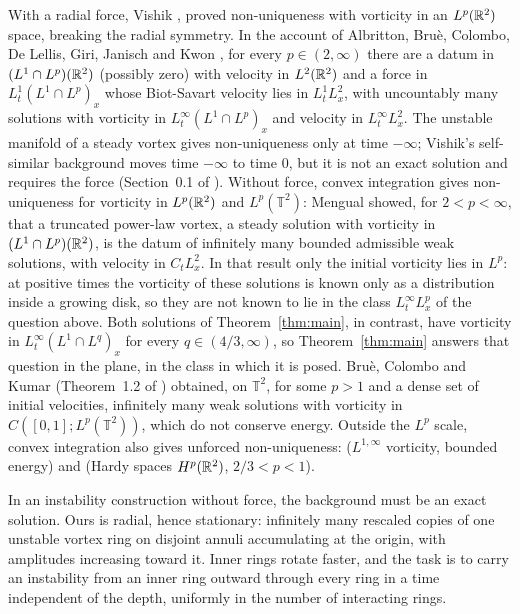 With a radial force, Vishik \cite{Vishik1}, \cite{Vishik2} proved
non-uniqueness with vorticity in an $L^p(\mathbb{R}^2)$ space, breaking the radial symmetry. In the
account of Albritton, Bru\`e, Colombo, De Lellis, Giri, Janisch and Kwon
\cite{ABCDGJK}, for every $p\in(2,\infty)$ there are a datum in $(L^1\cap L^p)(\mathbb{R}^2)$
(possibly zero) with velocity in $L^2(\mathbb{R}^2)$ and a force in $L^1_t(L^1\cap L^p)_x$ whose
Biot-Savart velocity lies in $L^1_tL^2_x$, with uncountably many solutions with vorticity in
$L^\infty_t(L^1\cap L^p)_x$ and velocity in $L^\infty_tL^2_x$. The unstable
manifold of a steady vortex gives non-uniqueness only at time $-\infty$;
Vishik's self-similar background moves time $-\infty$ to time $0$, but it is
not an exact solution and requires the force (Section~0.1 of \cite{ABCDGJK}).
Without force, convex integration gives non-uniqueness for vorticity in $L^p(\mathbb{R}^2)$ and
$L^p(\mathbb T^2)$:
Mengual \cite{Mengual} showed, for $2<p<\infty$, that a truncated power-law
vortex, a steady solution with vorticity in $(L^1\cap L^p)(\mathbb{R}^2)$, is the datum of
infinitely many bounded admissible weak solutions, with velocity in $C_tL^2_x$.
In that result only the initial vorticity lies in $L^p$: at positive times the
vorticity of these solutions is known only as a distribution inside a growing disk,
so they are not known to lie in the class $L^\infty_tL^p_x$ of the question above.
Both solutions of Theorem~\ref{thm:main}, in contrast, have vorticity in
$L^\infty_t(L^1\cap L^q)_x$ for every $q\in(4/3,\infty)$, so Theorem~\ref{thm:main}
answers that question in the plane, in the class in which it is posed. Bru\`e,
Colombo and Kumar (Theorem~1.2 of \cite{BrueColomboKumar}) obtained, on
$\mathbb T^2$, for some $p>1$ and a dense set of initial velocities, infinitely
many weak solutions with vorticity in $C([0,1];L^p(\mathbb T^2))$, which do not conserve
energy. Outside the $L^p$ scale, convex integration also gives unforced
non-uniqueness: \cite{BrueColombo}
($L^{1,\infty}$ vorticity, bounded energy) and \cite{BuckModena} (Hardy spaces
$H^p(\mathbb{R}^2)$, $2/3<p<1$).

In an instability construction without force, the background must be an exact
solution. Ours is radial, hence stationary: infinitely many rescaled copies of
one unstable vortex ring on disjoint annuli accumulating at the origin, with
amplitudes increasing toward it. Inner rings rotate faster, and the task is to
carry an instability from an inner ring outward through every ring in a time
independent of the depth, uniformly in the number of interacting rings.


